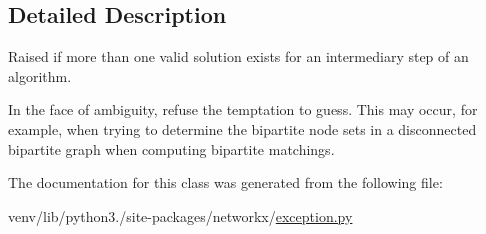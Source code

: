 \subsection{Detailed Description}
\begin{DoxyVerb}Raised if more than one valid solution exists for an intermediary step
of an algorithm.

In the face of ambiguity, refuse the temptation to guess.
This may occur, for example, when trying to determine the
bipartite node sets in a disconnected bipartite graph when
computing bipartite matchings.\end{DoxyVerb}
 

The documentation for this class was generated from the following file\+:\begin{DoxyCompactItemize}
\item 
venv/lib/python3./site-\/packages/networkx/\hyperlink{exception_8py}{exception.\+py}\end{DoxyCompactItemize}
